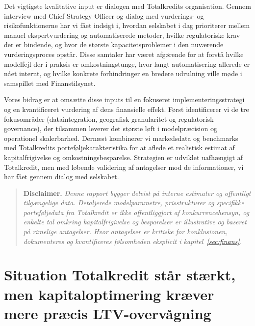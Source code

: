 \documentclass[12pt]{article}
\begin{document}
Det vigtigste kvalitative input er dialogen med Totalkredits organisation. Gennem interview med Chief Strategy Officer og dialog med vurderings- og risikofunktionerne har vi fået indsigt i, hvordan selskabet i dag prioriterer mellem manuel ekspertvurdering og automatiserede metoder, hvilke regulatoriske krav der er bindende, og hvor de største kapacitetsproblemer i den nuværende vurderingsproces opstår. Disse samtaler har været afgørende for at forstå hvilke modelfejl der i praksis er omkostningstunge, hvor langt automatisering allerede er nået internt, og hvilke konkrete forhindringer en bredere udrulning ville møde i samspillet med Finanstilsynet.

Vores bidrag er at omsætte disse inputs til en fokuseret implementeringsstrategi og en kvantificeret vurdering af dens finansielle effekt. Først identificerer vi de tre fokusområder (dataintegration, geografisk granularitet og regulatorisk governance), der tilsammen leverer det største løft i modelpræcision og operationel skalerbarhed. Dernæst kombinerer vi markedsdata og benchmarks med Totalkredits porteføljekarakteristika for at aflede et realistisk estimat af kapitalfrigivelse og omkostningsbesparelse. Strategien er udviklet uafhængigt af Totalkredit, men med løbende validering af antagelser mod de informationer, vi har fået gennem dialog med selskabet.

\begin{quote}
    \textbf{Disclaimer.} \textit{Denne rapport bygger delvist på interne estimater og offentligt tilgængelige data. Detaljerede modelparametre, prisstrukturer og specifikke porteføljedata fra Totalkredit er ikke offentliggjort af konkurrencehensyn, og enkelte tal omkring kapitalfrigivelse og besparelser er illustrative og baseret på rimelige antagelser. Hvor antagelser er kritiske for konklusionen, dokumenteres og kvantificeres følsomheden eksplicit i kapitel~\ref{sec:finans}.}
\end{quote}

\newpage

\section{Situation \textbar{} Totalkredit står stærkt, men kapitaloptimering kræver mere præcis LTV-overvågning}
\label{sec:situation}
\end{document}
